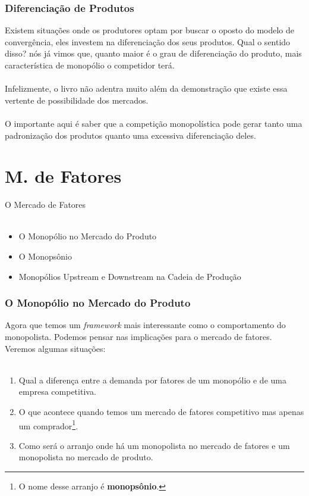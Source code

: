 \documentclass{beamer}[10]
\begin{document}

\begin{frame}
	\frametitle{Diferenciação de Produtos}

	Existem situações onde os produtores optam por buscar o oposto do modelo de convergência, eles investem na diferenciação dos seus produtos. Qual o sentido disso? nós já vimos que, quanto maior é o grau de diferenciação do produto, mais característica de monopólio o competidor terá.
	\\~\\
	Infelizmente, o livro não adentra muito além da demonstração que existe essa vertente de possibilidade dos mercados.
	\\~\\
	O importante aqui é saber que a competição monopolística pode gerar tanto uma padronização dos produtos quanto uma excessiva diferenciação deles.

\end{frame}

\section{M. de Fatores}

\begin{frame}
	\huge O Mercado de Fatores \normalsize
	\\~\\
	\begin{itemize}
		\item O Monopólio no Mercado do Produto
		\item O Monopsônio
		\item Monopólios Upstream e Downstream na Cadeia de Produção
	\end{itemize}
\end{frame}


\begin{frame}
	\frametitle{O Monopólio no Mercado do Produto}

	Agora que temos um \textit{framework} mais interessante como o comportamento do monopolista. Podemos pensar nas implicações para o mercado de fatores. Veremos algumas situações:
	\\~\\
	\begin{enumerate}
		\item Qual a diferença entre a demanda por fatores de um monopólio e de uma empresa competitiva.
	
		\item O que acontece quando temos um mercado de fatores competitivo mas apenas um comprador\footnote{O nome desse arranjo é \textbf{monopsônio}.}.
	
		\item Como será o arranjo onde há um monopolista no mercado de fatores e um monopolista no mercado de produto.
	\end{enumerate}
\end{frame}
\end{document}
